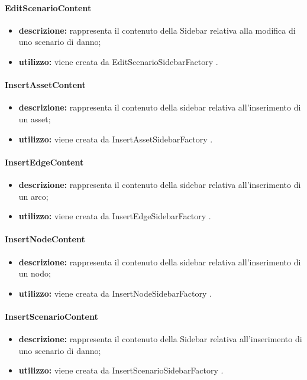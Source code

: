 \paragraph{EditScenarioContent}
\begin{itemize}
	\item \textbf{descrizione:} rappresenta il contenuto della Sidebar relativa alla modifica di uno scenario di danno;
	\item \textbf{utilizzo:} viene creata da EditScenarioSidebarFactory .
\end{itemize}
\paragraph{InsertAssetContent}
\begin{itemize}
	\item \textbf{descrizione:} rappresenta il contenuto della sidebar relativa all'inserimento di un asset;
	\item \textbf{utilizzo:} viene creata da InsertAssetSidebarFactory .
\end{itemize}
\paragraph{InsertEdgeContent}
\begin{itemize}
	\item \textbf{descrizione:} rappresenta il contenuto della sidebar relativa all'inserimento di un arco;
	\item \textbf{utilizzo:} viene creata da InsertEdgeSidebarFactory .
\end{itemize}
\paragraph{InsertNodeContent}
\begin{itemize}
	\item \textbf{descrizione:} rappresenta il contenuto della sidebar relativa all'inserimento di un nodo;
	\item \textbf{utilizzo:} viene creata da InsertNodeSidebarFactory .
\end{itemize}
\paragraph{InsertScenarioContent}
\begin{itemize}
	\item \textbf{descrizione:} rappresenta il contenuto della Sidebar relativa all'inserimento di uno scenario di danno;
	\item \textbf{utilizzo:} viene creata da InsertScenarioSidebarFactory .
\end{itemize}
